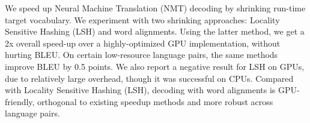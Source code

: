 We speed up Neural Machine Translation (NMT) decoding by shrinking run-time target vocabulary. We experiment with two shrinking approaches: Locality Sensitive Hashing (LSH) and word alignments. Using the latter method, we get a 2x overall speed-up over a highly-optimized GPU implementation, without hurting BLEU. On certain low-resource language pairs, the same methods improve BLEU by 0.5 points. We also report a negative result for LSH on GPUs, due to relatively large overhead, though it was successful on CPUs. Compared with Locality Sensitive Hashing (LSH), decoding with word alignments is GPU-friendly, orthogonal to existing speedup methods and more robust across language pairs.
